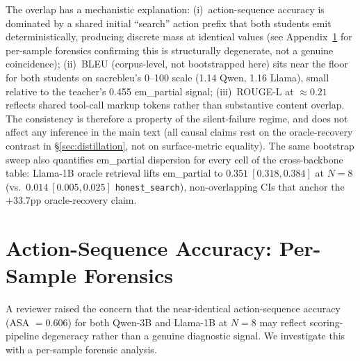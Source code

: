 \begin{table}[t]
\small
\centering

\caption{Bootstrap 95\% CIs (10{,}000 resamples, seed 42) for per-sample surface metrics and task em\_partial across backbones and retrieval modes. Qwen-3B per-sample action-sequence and ROUGE-L values come from the stored W1 surface-metrics log; Llama-1B values are recomputed via the same extraction from \texttt{exp\_013} eval details. At $N\!=\!8$ the CIs overlap (ROUGE-L $0.214~[0.204,0.224]$ vs.\ $0.212~[0.202,0.224]$). The action\_seq\_acc CIs are trivially identical ($0.606~[0.595,0.616]$ for both) because the per-sample scores are themselves identical---a structural degeneracy, not a coincidence (see Appendix~\ref{app:asa_forensics}).}
\label{tab:bootstrap_ci}
\end{table}

The overlap has a mechanistic explanation: (i)~action-sequence accuracy is dominated by a shared initial ``search'' action prefix that both students emit deterministically, producing discrete mass at identical values (see Appendix~\ref{app:asa_forensics} for per-sample forensics confirming this is structurally degenerate, not a genuine coincidence); (ii)~BLEU (corpus-level, not bootstrapped here) sits near the floor for both students on sacrebleu's 0--100 scale (1.14 Qwen, 1.16 Llama), small relative to the teacher's 0.455 em\_partial signal; (iii)~ROUGE-L at $\approx 0.21$ reflects shared tool-call markup tokens rather than substantive content overlap. The consistency is therefore a property of the silent-failure regime, and does not affect any inference in the main text (all causal claims rest on the oracle-recovery contrast in \S\ref{sec:distillation}, not on surface-metric equality). The same bootstrap sweep also quantifies em\_partial dispersion for every cell of the cross-backbone table: Llama-1B oracle retrieval lifts em\_partial to $0.351~[0.318,0.384]$ at $N\!=\!8$ (vs.\ $0.014~[0.005,0.025]$ \texttt{honest\_search}), non-overlapping CIs that anchor the $+33.7$pp oracle-recovery claim.

\section{Action-Sequence Accuracy: Per-Sample Forensics}
\label{app:asa_forensics}

A reviewer raised the concern that the near-identical action-sequence accuracy (ASA $=0.606$) for both Qwen-3B and Llama-1B at $N\!=\!8$ may reflect scoring-pipeline degeneracy rather than a genuine diagnostic signal. We investigate this with a per-sample forensic analysis.

